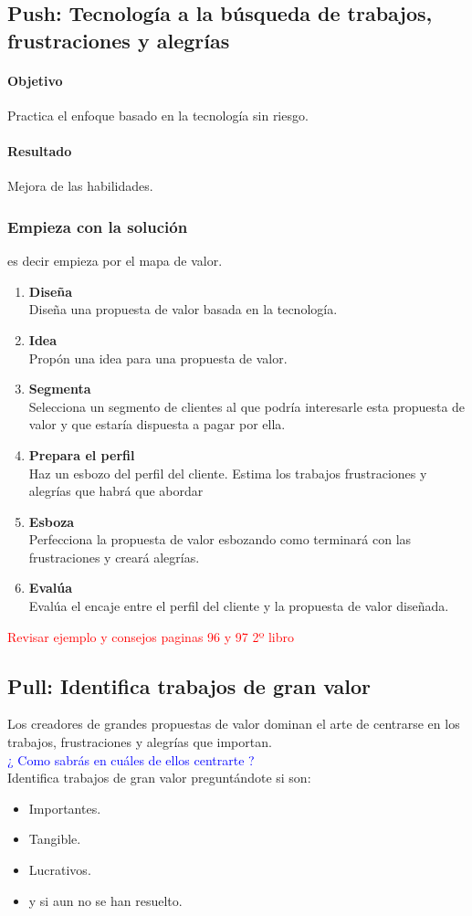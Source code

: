 \documentclass[11pt]{book}
\begin{document}
\subsection{Push: Tecnología a la búsqueda de trabajos, frustraciones y alegrías}
\paragraph{Objetivo}
Practica el enfoque basado en la tecnología sin riesgo.
\paragraph{Resultado}
Mejora de las habilidades.
\subsubsection{Empieza con la solución}
es decir empieza por el mapa de valor.
\begin{enumerate}
\item \textbf{ Diseña }\\
Diseña una propuesta de valor basada en la tecnología. 
\item \textbf{ Idea }\\
Propón una idea para una propuesta de valor.
\item \textbf{ Segmenta }\\
Selecciona un segmento de clientes al que podría interesarle esta propuesta de valor y que estaría dispuesta a pagar por ella.
\item \textbf{ Prepara el perfil }\\
Haz un esbozo del perfil del cliente. Estima los trabajos frustraciones y alegrías que habrá que abordar
\item \textbf{ Esboza }\\
Perfecciona la propuesta de valor esbozando como terminará con las frustraciones y creará alegrías.
\item \textbf{ Evalúa }\\
Evalúa el encaje entre el perfil del cliente y la propuesta de valor diseñada.
\end{enumerate}
\textcolor{red}{Revisar ejemplo y consejos paginas 96 y 97 2º libro}
\subsection{Pull: Identifica trabajos de gran valor}
Los creadores de grandes propuestas de valor dominan el arte de centrarse en los trabajos, frustraciones y alegrías que importan.\\
\textcolor{blue}{¿ Como sabrás en cuáles de ellos centrarte ?}\\
Identifica trabajos de gran valor preguntándote si son:
\begin{itemize}
\item Importantes.
\item Tangible.
\item Lucrativos.
\item y si aun no se han resuelto.
\end{itemize}
\end{document}
